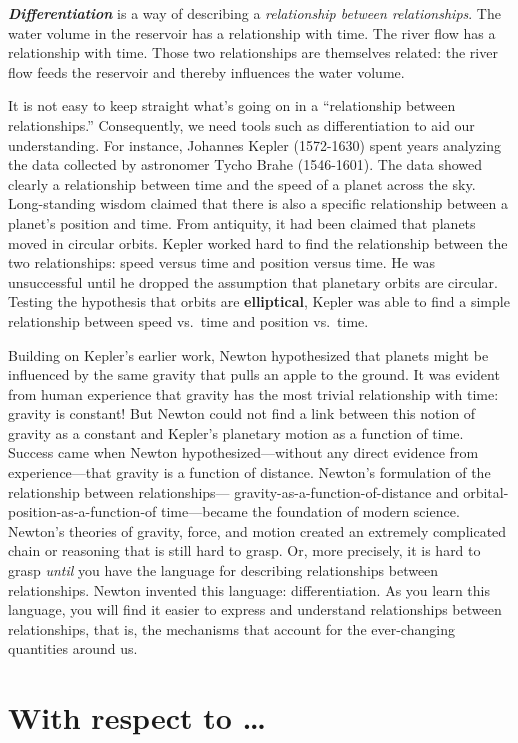 \documentclass[
  letterpaper,
  DIV=11,
  numbers=noendperiod,
  oneside]{scrreprt}
\begin{document}
\textbf{\emph{Differentiation}} is a way of describing a
\emph{relationship between relationships}. The water volume in the
reservoir has a relationship with time. The river flow has a
relationship with time. Those two relationships are themselves related:
the river flow feeds the reservoir and thereby influences the water
volume.

It is not easy to keep straight what's going on in a ``relationship
between relationships.'' Consequently, we need tools such as
differentiation to aid our understanding. For instance, Johannes Kepler
(1572-1630) spent years analyzing the data collected by astronomer Tycho
Brahe (1546-1601). The data showed clearly a relationship between time
and the speed of a planet across the sky. Long-standing wisdom claimed
that there is also a specific relationship between a planet's position
and time. From antiquity, it had been claimed that planets moved in
circular orbits. Kepler worked hard to find the relationship between the
two relationships: speed versus time and position versus time. He was
unsuccessful until he dropped the assumption that planetary orbits are
circular. Testing the hypothesis that orbits are \textbf{elliptical},
Kepler was able to find a simple relationship between speed vs.~time and
position vs.~time.

Building on Kepler's earlier work, Newton hypothesized that planets
might be influenced by the same gravity that pulls an apple to the
ground. It was evident from human experience that gravity has the most
trivial relationship with time: gravity is constant! But Newton could
not find a link between this notion of gravity as a constant and
Kepler's planetary motion as a function of time. Success came when
Newton hypothesized---without any direct evidence from experience---that
gravity is a function of distance. Newton's formulation of the
relationship between relationships--- gravity-as-a-function-of-distance
and orbital-position-as-a-function-of time---became the foundation of
modern science. Newton's theories of gravity, force, and motion created
an extremely complicated chain or reasoning that is still hard to grasp.
Or, more precisely, it is hard to grasp \emph{until} you have the
language for describing relationships between relationships. Newton
invented this language: differentiation. As you learn this language, you
will find it easier to express and understand relationships between
relationships, that is, the mechanisms that account for the
ever-changing quantities around us.

\hypertarget{with-respect-to}{%
\section{With respect to \ldots{}}\label{with-respect-to}}
\end{document}
